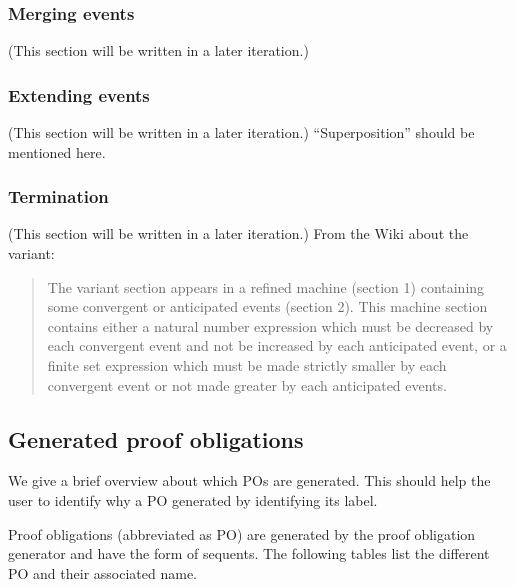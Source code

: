 \subsubsection{Merging events}
\label{merging_events}
(This section will be written in a later iteration.)

\subsubsection{Extending events}
\label{extending_events}
(This section will be written in a later iteration.)
``Superposition'' should be mentioned here.


\subsubsection{Termination}
\label{termination}
(This section will be written in a later iteration.)
From the Wiki about the variant:
\begin{quote}
  The variant section appears in a refined machine (section 1) containing some convergent or anticipated events (section 2).
  This machine section contains either a natural number expression which must be decreased by each convergent event and not be
  increased by each anticipated event, or a finite set expression which must be made strictly smaller by each convergent event 
  or not made greater by each anticipated events. 
\end{quote}
\subsection{Generated proof obligations}
\label{generated_proof_obligations}

We give a brief overview about which POs are generated. This should help the user to identify why a PO generated by identifying its label.

Proof obligations (abbreviated as PO) are generated by the proof obligation generator and have the form of sequents. The following tables list the different PO and their associated name.

